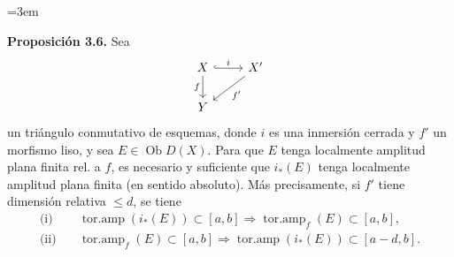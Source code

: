 \providecommand{\sisi}[2]{#2}

\providecommand{\Ob}{\operatorname{Ob}}
\providecommand{\D}{\mathrm D}
\providecommand{\Ho}{\mathrm H}
\providecommand{\RHom}{\mathrm R\!\operatorname{Hom}}
\providecommand{\parfamp}{\operatorname{parf.amp}}
\providecommand{\tamp}{\operatorname{tor.amp}}
\providecommand{\Qcoh}{\operatorname{Qcoh}}
\providecommand{\Mod}{\operatorname{Mod}}
\providecommand{\Coh}{\operatorname{Coh}}
\providecommand{\Lib}{\operatorname{Lib}}
\providecommand{\Loclib}{\operatorname{Loclib}}
\providecommand{\qcoh}{\mathrm{qcoh}}
\providecommand{\coh}{\mathrm{coh}}
\providecommand{\parf}{\mathrm{parf}}
\providecommand{\torf}{\mathrm{torf}}
\providecommand{\id}{\operatorname{id}}
\providecommand{\uparf}{\underline{\mathrm{parf}}\rule[-1ex]{0pt}{0pt}}
\providecommand{\Coker}{\operatorname{Coker}}
\providecommand{\rank}{\operatorname{rank}}
\providecommand{\rg}{\operatorname{rg}}
\providecommand{\Hom}{\operatorname{Hom}}
\providecommand{\Ext}{\operatorname{Ext}}
\providecommand{\Spec}{\operatorname{Spec}}
\providecommand{\Cone}{\operatorname{Cone}}
\providecommand{\pt}{\operatorname{Pt}}
\providecommand{\ind}{\operatorname{ind}}
\hfuzz=20pt
\emergencystretch=3em

\textbf{Proposición 3.6.} Sea
\[
\begin{tikzcd}
X \arrow[r,hook,"i"] \arrow[d,"f"'] & X' \arrow[dl,"f'"]\\
Y &
\end{tikzcd}
\]
un triángulo conmutativo de esquemas, donde \(i\) es una inmersión cerrada y \(f'\) un morfismo liso, y sea \(E\in\Ob D(X)\). Para que \(E\) tenga localmente amplitud plana finita rel. a \(f\), es necesario y suficiente que \(i_*(E)\) tenga localmente amplitud plana finita (en sentido absoluto). Más precisamente, si \(f'\) tiene dimensión relativa \(\leq d\), se tiene
\begin{align*}
\text{(i)}\quad &\tamp(i_*(E))\subset[a,b] \Longrightarrow \tamp_f(E)\subset[a,b],\\
\text{(ii)}\quad &\tamp_f(E)\subset[a,b] \Longrightarrow \tamp(i_*(E))\subset[a-d,b].
\end{align*}

